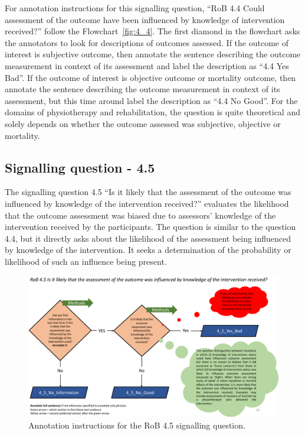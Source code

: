 \documentclass[sn-mathphys,Numbered]{sn-jnl}%
\begin{document}
For annotation instructions for this signalling question, ``RoB 4.4 Could assessment of the outcome have been influenced by knowledge of intervention received?'' follow the Flowchart~\ref{fig:4_4}.
The first diamond in the flowchart asks the annotators to look for descriptions of outcomes assessed.
If the outcome of interest is subjective outcome, then annotate the sentence describing the outcome measurement in context of its assessment and label the description as ``4.4 Yes Bad''.
If the outcome of interest is objective outcome or mortality outcome, then annotate the sentence describing the outcome measurement in context of its assessment, but this time around label the description as ``4.4 No Good''.
For the domains of physiotherapy and rehabilitation, the question is quite theoretical and solely depends on whether the outcome assessed was subjective, objective or mortality.


%
%
%
\subsection*{Signalling question - 4.5 }
\label{subsec:4_5}
%
The signalling question 4.5 ``Is it likely that the assessment of the outcome was influenced by knowledge of the intervention received?'' evaluates the likelihood that the outcome assessment was biased due to assessors' knowledge of the intervention received by the participants.
The question is similar to the question 4.4, but it directly asks about the likelihood of the assessment being influenced by knowledge of the intervention.
It seeks a determination of the probability or likelihood of such an influence being present.


%
%
%
\begin{figure}[htbp]
    \centering
    \includegraphics[width=\textwidth]{figures/4_5.pdf}
    \caption{Annotation instructions for the RoB 4.5 signalling question.}
    \label{fig:4_5}
\end{figure}
%
%
%
\end{document}
